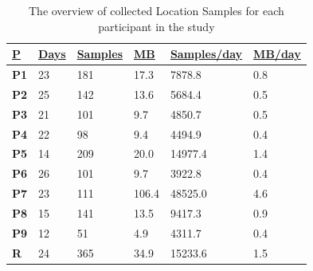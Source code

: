 \begin{table}[]
    \centering
        \begin{tabular}{|l|l|l|l|l|l|}
        \hline
        {\ul \textbf{P}} & {\ul \textbf{Days}} & {\ul \textbf{Samples}} & {\ul \textbf{MB}} & {\ul \textbf{Samples/day}} & {\ul \textbf{MB/day}} \\ \hline
        \textbf{P1}                & 23                   & 181                        & 17.3                           & 7878.8                              & 0.8                              \\ \hline
        \textbf{P2}                & 25                   & 142                        & 13.6                           & 5684.4                              & 0.5                             \\ \hline
        \textbf{P3}                & 21                   & 101                        & 9.7                            & 4850.7                              & 0.5                             \\ \hline
        \textbf{P4}                & 22                   & 98                         & 9.4                            & 4494.9                              & 0.4                             \\ \hline
        \textbf{P5}                & 14                   & 209                        & 20.0                           & 14977.4                             & 1.4                             \\ \hline
        \textbf{P6}                & 26                   & 101                        & 9.7                            & 3922.8                              & 0.4                             \\ \hline
        \textbf{P7}                & 23                   & 111                       & 106.4                          & 48525.0                             & 4.6                             \\ \hline
        \textbf{P8}                & 15                   & 141                        & 13.5                           & 9417.3                              & 0.9                              \\ \hline
        \textbf{P9}                & 12                   & 51                         & 4.9                            & 4311.7                              & 0.4                              \\ \hline
        \textbf{R}                 & 24                   & 365                        & 34.9                           & 15233.6                             & 1.5                                    \\ \hline
        \end{tabular}

    \caption{The overview of collected Location Samples for each participant in the study}
    \label{tab:location-samples}
\end{table}

